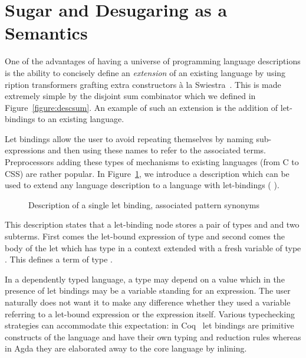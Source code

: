 \section{Sugar and Desugaring as a Semantics}\label{section:letbinding}

One of the advantages of having a universe of programming language
descriptions is the ability to concisely define an \emph{extension}
of an existing language by using ription transformers
grafting extra constructors à la Swiestra~\citeyear{swierstra_2008}.
This is made extremely simple by the disjoint sum combinator
 which we defined in Figure~\ref{figure:descsum}.
An example of such an extension is the addition of let-bindings to
an existing language.

Let bindings allow the user to avoid repeating themselves by naming
sub-expressions and then using these names to refer to the associated
terms. Preprocessors adding these types of mechanisms to existing
languages (from C to CSS) are rather popular. In Figure~\ref{defn:letD},
we introduce a description  which can be used to extend any
language description  to a language with let-bindings
(  ).

\begin{figure}[h]
\begin{minipage}[t]{0.45\textwidth}
\end{minipage}
\begin{minipage}[t]{0.45\textwidth}
\end{minipage}
\caption{Description of a single let binding, associated pattern synonyms
  \label{defn:letD}}
\end{figure}

This description states that a let-binding node stores a pair of types
 and  and two subterms. First comes the let-bound
expression of type  and second comes the body of the let which
has type  in a context extended with a fresh variable of type
. This defines a term of type .

In a dependently typed language, a type may depend on a value which
in the presence of let bindings may be a variable standing for an
expression. The user naturally does not want it to make any difference
whether they used a variable referring to a let-bound expression or
the expression itself. Various typechecking strategies can accommodate
this expectation: in Coq~\cite{Coq:manual} let bindings are primitive
constructs of the language and have their own typing and reduction
rules whereas in Agda they are elaborated away to the core language
by inlining.

